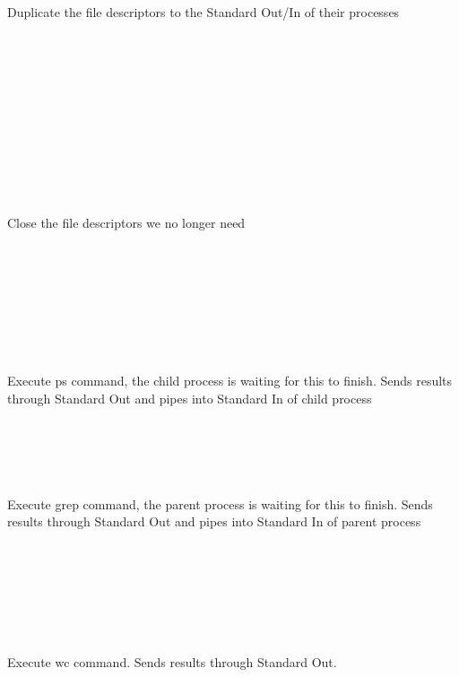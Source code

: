 \documentclass[a4paper,11pt,twoside]{article}
\begin{document}
\begin{multicols}{2}
\\
\\
\\
\\
\\
\noindent
Duplicate the file descriptors to the Standard Out/In of their processes\\
\\
\\
\\
\\
\\
\\
\\
\\
\\
\\
\\
Close the file descriptors we no longer need
\\
\\
\\
\\
\\
\\
\\
\\
\\
Execute ps command, the child process is waiting for this to finish. Sends results through Standard Out and pipes into Standard In of child process
\\
\\
\\
\\
\\
\\
Execute grep command, the parent process is waiting for this to finish. Sends results through Standard Out and pipes into Standard In of parent process
\\
\\
\\
\\
\\
\\
\\
\\
Execute wc command. Sends results through Standard Out.
\vfill\null
\columnbreak

\end{multicols}
\end{document}
